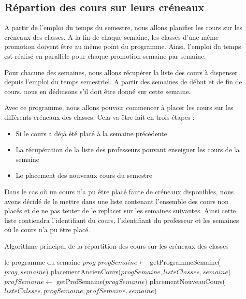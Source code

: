 \subsection{Répartion des cours sur leurs créneaux}

A partir de l'emploi du temps du semestre, nous allons planifier les cours sur les créneaux des classes. A la fin de chaque semaine, les classes d'une même promotion doivent être au même point du programme. Ainsi, l'emploi du temps est réalisé en parallèle pour chaque promotion semaine par semaine.

Pour chacune des semaines, nous allons récupérer la liste des cours à dispenser depuis l'emploi du temps semestriel. A partir des semaines de début et de fin de cours, nous en déduisons s'il doit être donné sur cette semaine.

Avec ce programme, nous allons pouvoir commencer à placer les cours sur les différents créneaux des classes. Cela va être fait en trois étapes : \\
\begin{itemize}
\item Si le cours a déjà été placé à la semaine précédente
\item La récupération de la liste des professeurs pouvant enseigner les cours de la semaine
\item Le placement des nouveaux cours du semestre\\
\end{itemize}

Dans le cas où un cours n'a pu être placé faute de créneaux disponibles, nous avons décidé de le mettre dans une liste contenant l'ensemble des cours non placés et de ne pas tenter de le replacer sur les semaines suivantes. Ainsi cette liste contiendra l'identifiant du cours, l'identifiant du professeur et les semaines où le cours n'a pu être placé.

\begin{algorithm}
\caption {Algorithme principal de la répartition des cours sur les créneaux des classes}
\begin{algorithmic}
\REQUIRE le programme du semaine $prog$
\STATE $progSemaine \leftarrow$ getProgrammeSemaine($prog, semaine$)
\STATE placementAncienCours($progSemaine, listeClasses, semaine$)
\STATE $profSemaine \leftarrow$ getProfSemaine($progSemaine$)
\STATE placementNouveauCours($listeCalsses, progSemaine, profSemaine, semaine$)
\ENDIF
{}
\ENDIF
\ENDFOR
{}
\end{algorithmic}
\end{algorithm}

